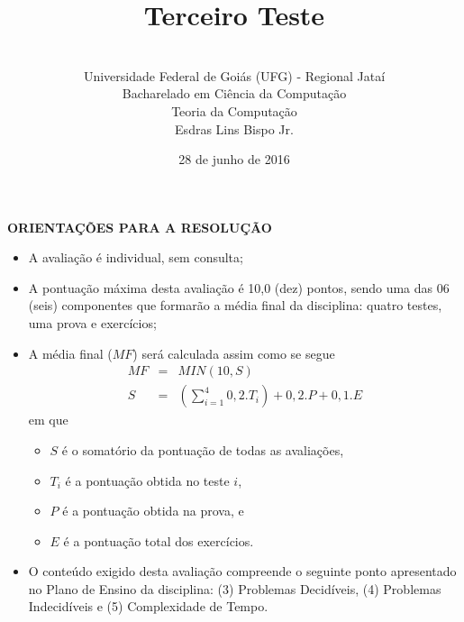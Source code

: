 \documentclass[12pt,a4paper,oneside]{article}
\author{\\Universidade Federal de Goiás (UFG) - Regional Jataí \\Bacharelado em Ciência da Computação \\Teoria da Computação \\Esdras Lins Bispo Jr.}
\date{28 de junho de 2016}
\title{\sc \huge Terceiro Teste}
\begin{document}
\maketitle

{\bf ORIENTAÇÕES PARA A RESOLUÇÃO}

\begin{itemize}
	\item A avaliação é individual, sem consulta;
	\item A pontuação máxima desta avaliação é 10,0 (dez) pontos, sendo uma das 06 (seis) componentes que formarão a média final da disciplina: quatro testes, uma prova e exercícios;
	\item A média final ($MF$) será calculada assim como se segue
	\begin{eqnarray}
		MF & = & MIN(10, S) \nonumber \\
		S & = & (\sum_{i=1}^{4} 0,2.T_i ) + 0,2.P  + 0,1.E \nonumber
	\end{eqnarray}
	em que 
	\begin{itemize}
		\item $S$ é o somatório da pontuação de todas as avaliações,
		\item $T_i$ é a pontuação obtida no teste $i$,
		\item $P$ é a pontuação obtida na prova, e
		\item $E$ é a pontuação total dos exercícios.
	\end{itemize}
	\item O conteúdo exigido desta avaliação compreende o seguinte ponto apresentado no Plano de Ensino da disciplina: (3) Problemas Decidíveis, (4) Problemas Indecidíveis e (5) Complexidade de Tempo.
\end{itemize}

\begin{center}
\end{center}

\newpage
\end{document}
